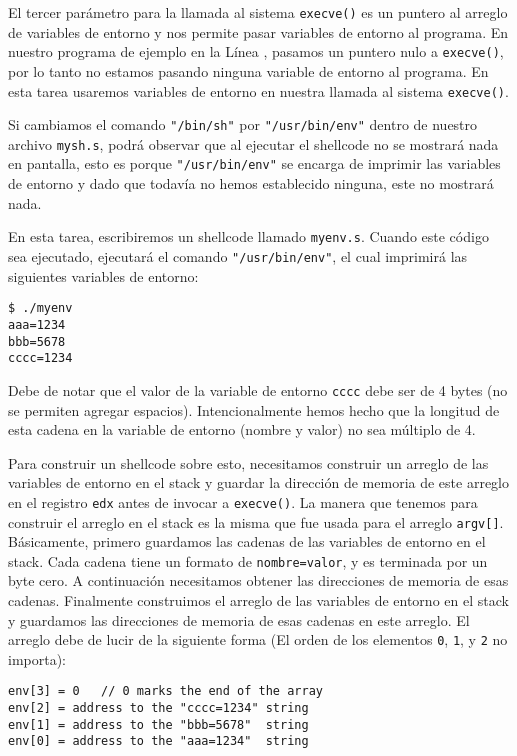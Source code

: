 El tercer parámetro para la llamada al sistema \texttt{execve()} es un puntero al arreglo de variables de entorno y nos permite pasar variables de entorno al programa. En nuestro programa de ejemplo en la Línea , pasamos un puntero nulo a \texttt{execve()}, por lo tanto no estamos pasando ninguna variable de entorno al programa. 
En esta tarea usaremos variables de entorno en nuestra llamada al sistema \texttt{execve()}.

Si cambiamos el comando \texttt{"/bin/sh"} por \texttt{"/usr/bin/env"} dentro de nuestro archivo \texttt{mysh.s}, podrá observar que al ejecutar el shellcode no se mostrará nada en pantalla, esto es porque \texttt{"/usr/bin/env"} se encarga de imprimir las variables de entorno y dado que todavía no hemos establecido ninguna, este no mostrará nada.

En esta tarea, escribiremos un shellcode llamado \texttt{myenv.s}. Cuando este código sea ejecutado, ejecutará el comando \texttt{"/usr/bin/env"}, el cual imprimirá las siguientes variables de entorno:

\begin{lstlisting}
$ ./myenv
aaa=1234
bbb=5678
cccc=1234
\end{lstlisting}

Debe de notar que el valor de la variable de entorno \texttt{cccc} debe ser de 4 bytes (no se permiten agregar espacios).
Intencionalmente hemos hecho que la longitud de esta cadena en la variable de entorno (nombre y valor) no sea múltiplo de 4.

Para construir un shellcode sobre esto, necesitamos construir un arreglo de las variables de entorno en el stack y guardar la dirección de memoria de este arreglo en el registro \texttt{edx}  antes de invocar a \texttt{execve()}. 
La manera que tenemos para construir el arreglo en el stack es la misma que fue usada para el arreglo  \texttt{argv[]}. 
Básicamente, primero guardamos las cadenas de las variables de entorno en el stack. Cada cadena tiene un formato de \texttt{nombre=valor}, y es terminada por un byte cero. A continuación necesitamos obtener las direcciones de memoria de esas cadenas. Finalmente construimos el arreglo de las variables de entorno en el stack y guardamos las direcciones de memoria de esas cadenas en este arreglo.
El arreglo debe de lucir de la siguiente forma (El orden de los elementos \texttt{0}, \texttt{1}, y \texttt{2} no importa):


\begin{lstlisting}
env[3] = 0   // 0 marks the end of the array
env[2] = address to the "cccc=1234" string
env[1] = address to the "bbb=5678"  string
env[0] = address to the "aaa=1234"  string
\end{lstlisting}



